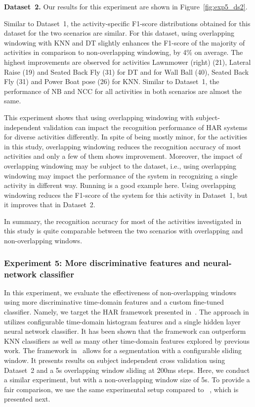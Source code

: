 \noindent\textbf{Dataset~2.} Our results for this experiment are shown in Figure~\ref{fig:exp5_ds2}. 

Similar to Dataset~1, the activity-specific F1-score distributions obtained for this dataset for the two scenarios are similar. For this dataset, using overlapping windowing with KNN and DT slightly enhances the F1-score of the majority of activities in comparison to non-overlapping windowing, by 4\% on average. The highest improvements are observed for activities Lawnmower (right) (21), Lateral Raise (19) and Seated Back Fly (31) for DT and for Wall Ball (40), Seated Back Fly (31) and Power Boat pose (26) for KNN. Similar to Dataset~1, the performance of NB and NCC for all activities in both scenarios are almost the same.

This experiment shows that using overlapping windowing with subject-independent validation can impact the recognition performance of HAR systems for diverse activities differently. In spite of being mostly minor, for the activities in this study, overlapping windowing reduces the recognition accuracy of most activities and only a few of them shows improvement. Moreover, the impact of overlapping windowing may be subject to the dataset, i.e., using overlapping windowing may impact the performance of the system in recognizing a single activity in different way. Running is a good example here. Using overlapping windowing reduces the F1-score of the system for this activity in Dataset~1, but it improves that in Dataset~2.  

In summary, the recognition accuracy for most of the activities investigated in this study is quite comparable between the two scenarios with overlapping and non-overlapping windows.    

\subsubsection{Experiment 5: More discriminative features and neural-network classifier}
In this experiment, we evaluate the effectiveness of non-overlapping windows using more discriminative time-domain features and a custom fine-tuned classifier. Namely, we target the HAR framework presented in~\cite{omid2019MPR}. The approach in~\cite{omid2019MPR} utilizes configurable time-domain histogram features and a single hidden layer neural network classifier. It has been shown that the framework can outperform KNN classifiers as well as many other time-domain features explored by previous work. The framework in~\cite{omid2019MPR} allows for a segmentation with a configurable sliding window. It presents results on subject independent cross validation using Dataset~2 and a 5s overlapping window sliding at 200ms steps. Here, we conduct a similar experiment, but with a non-overlapping window size of 5s. To provide a fair comparison, we use the same experimental setup compared to ~\cite{omid2019MPR}, which is presented next. 

